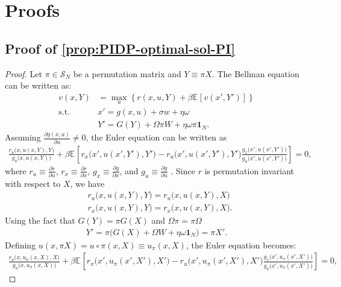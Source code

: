 \documentclass[12pt]{article}
\newcommand{\expec}[2][]{\ensuremath{\mathbb{E}_{{#1}}\left[ {#2} \right]}}
\begin{document}
\section{Proofs}
	
\subsection{Proof of \cref{prop:PIDP-optimal-sol-PI}}\label{sec:PIDP-optimal-sol-PI}

\begin{proof}
Let $\pi \in \mathcal{S}_N$ be a permutation matrix and $Y \equiv \pi X$. The Bellman equation can be written as: 
\begin{align}
v(x,Y) &=\max_{u}\left\{r(x,u,Y) + \beta \expec{v(x',Y')}\right\}\label{equ:Bellman-permuted}\\
\text{s.t. } & x' = g(x,u) + \sigma w + \eta \omega \label{equ:lom-x-permuted}\\
& Y' =  G(Y)+ \Omega \pi W+\eta \omega \pi \mathbf{1}_N \label{equ:lom-Y-permuted}.
\end{align}
Assuming $\frac{\partial g(x,u)}{\partial u} \neq 0$, the Euler equation can be written as
\begin{align*}
\frac{r_u\big(x,u(x,Y),Y\big)}{g_u\big(x,u(x,Y)\big)}+\beta \expec{r_x\big(x',u(x',Y'),Y'\big)-r_u\big(x',u(x',Y'),Y'\big)\frac{g_x\big(x',u(x',Y')\big)}{g_u\big(x',u(x',Y')\big)}}=0,
\end{align*}
where $r_u \equiv \frac{\partial r}{\partial u}$, $r_x \equiv  \frac{\partial r}{\partial x}$, $g_x \equiv \frac{\partial g}{\partial x}$, and $g_u \equiv \frac{\partial g}{\partial u}$ . Since $r$ is permutation invariant with respect to $X$, we have
\begin{align*}
&r_u\big(x,u(x,Y),Y\big) = r_u\big(x,u(x,Y),X\big)\\
&r_x\big(x,u(x,Y),Y\big) = r_x\big(x,u(x,Y),X\big).
\end{align*}
Using the fact that $G(Y) = \pi G(X)$ and $ \Omega\pi = \pi\Omega$ 
\begin{align}
\label{equ:Perm-equivariance-lom}	
Y' = \pi\big(G(X)+\Omega W+\eta \omega \mathbf{1}_N\big) = \pi X'. 
\end{align}
Defining $u(x,\pi X) = u\circ \pi (x,X)\equiv u_\pi (x,X)$, the Euler equation becomes:
\begin{align*}
\frac{r_u\big(x,u_\pi(x,X),X\big)}{g_u\big(x,u_\pi(x,X)\big)}+\beta \expec{r_x\big(x',u_\pi(x',X'),X'\big)-r_u\big(x',u_\pi(x',X'),X'\big)\frac{g_x\big(x',u_\pi(x',X')\big)}{g_u\big(x',u_\pi(x',X')\big)}}=0,

\end{align*}
\end{proof}
\end{document}
